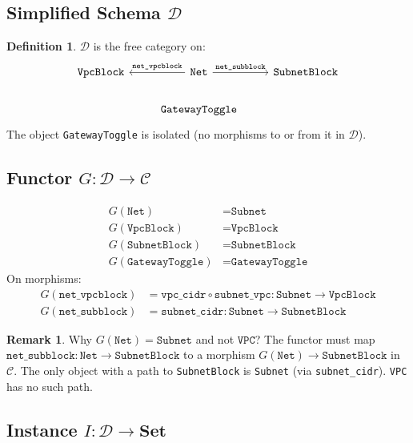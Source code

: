 \documentclass[11pt,a4paper]{article}
\theoremstyle{definition}
\newtheorem{definition}{Definition}[section]
\newtheorem{remark}{Remark}[section]
\theoremstyle{plain}
\newcommand{\Set}{\mathbf{Set}}
\begin{document}
\subsection{Simplified Schema \texorpdfstring{$\mathcal{D}$}{D}}

\begin{definition}
$\mathcal{D}$ is the free category on:
\[
\begin{tikzcd}
\texttt{VpcBlock} & \texttt{Net} \arrow[l, "\texttt{net\_vpcblock}"'] \arrow[r, "\texttt{net\_subblock}"] & \texttt{SubnetBlock} \\
& \texttt{GatewayToggle} &
\end{tikzcd}
\]
The object \texttt{GatewayToggle} is isolated (no morphisms to or from it in $\mathcal{D}$).
\end{definition}

\subsection{Functor \texorpdfstring{$G \colon \mathcal{D} \to \mathcal{C}$}{G: D -> C}}

\begin{align*}
G(\texttt{Net})           &= \texttt{Subnet} \\
G(\texttt{VpcBlock})      &= \texttt{VpcBlock} \\
G(\texttt{SubnetBlock})   &= \texttt{SubnetBlock} \\
G(\texttt{GatewayToggle}) &= \texttt{GatewayToggle}
\end{align*}
On morphisms:
\begin{align*}
G(\texttt{net\_vpcblock}) &= \texttt{vpc\_cidr} \circ \texttt{subnet\_vpc} \colon \texttt{Subnet} \to \texttt{VpcBlock} \\
G(\texttt{net\_subblock}) &= \texttt{subnet\_cidr} \colon \texttt{Subnet} \to \texttt{SubnetBlock}
\end{align*}

\begin{remark}
Why $G(\texttt{Net}) = \texttt{Subnet}$ and not $\texttt{VPC}$? The functor must map $\texttt{net\_subblock} \colon \texttt{Net} \to \texttt{SubnetBlock}$ to a morphism $G(\texttt{Net}) \to \texttt{SubnetBlock}$ in $\mathcal{C}$. The only object with a path to \texttt{SubnetBlock} is \texttt{Subnet} (via \texttt{subnet\_cidr}). \texttt{VPC} has no such path.
\end{remark}

\subsection{Instance \texorpdfstring{$I \colon \mathcal{D} \to \Set$}{I: D -> Set}}
\end{document}

